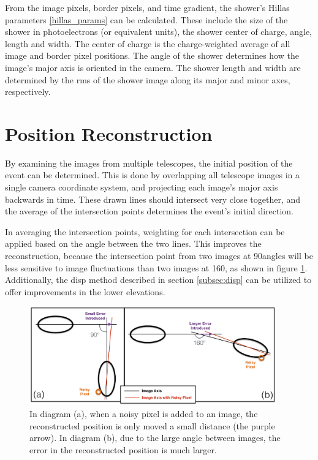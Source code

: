 From the image pixels, border pixels, and time gradient, the shower's Hillas parameters \ref{hillas_params} can be calculated.
These include the size of the shower in photoelectrons (or equivalent units), the shower center of charge, angle, length and width.
The center of charge is the charge-weighted average of all image and border pixel positions.
The angle of the shower determines how the image's major axis is oriented in the camera.
The shower length and width are determined by the rms of the shower image along its major and minor axes, respectively.


\section{Position Reconstruction}\label{subsec:posrecon}
By examining the images from multiple telescopes, the initial position of the event can be determined.
This is done by overlapping all telescope images in a single camera coordinate system, and projecting each image's major axis backwards in time.
These drawn lines should intersect very close together, and the average of the intersection points determines the event's initial direction.

In averaging the intersection points, weighting for each intersection can be applied based on the angle between the two lines.
This improves the reconstruction, because the intersection point from two images at 90\degree angles will be less sensitive to image fluctuations than two images at 160\degree, as shown in figure \ref{fig:largeintersectangle}.
Additionally, the disp method described in section \ref{subsec:disp} can be utilized to offer improvements in the lower elevations.

\begin{figure}[ht]
  \begin{center}
    \includegraphics[width=0.95\textwidth]{images/large_angle_image_intersection_error_cropped.eps}
    \caption[Large Image Intersection Angles]{In diagram (a), when a noisy pixel is added to an image, the reconstructed position is only moved a small distance (the purple arrow).  In diagram (b), due to the large angle between images, the error in the reconstructed position is much larger.}\label{fig:largeintersectangle}
  \end{center}
\end{figure}


